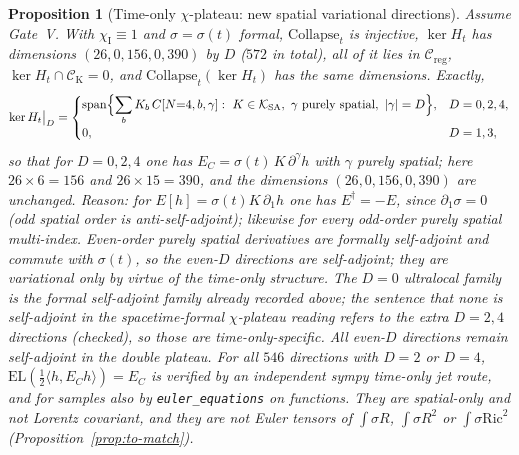 \documentclass{article}
\newtheorem{proposition}{Proposition}
\theoremstyle{remark}
\newcommand{\chiI}{\chi_{\mathrm I}}
\newcommand{\Creg}{\mathcal C_{\mathrm{reg}}}
\newcommand{\Coll}{\mathrm{Collapse}}
\begin{document}
\begin{proposition}[Time-only $\chi$-plateau: new spatial variational directions]
\label{prop:to-chiplateau}
Assume Gate~V.
With $\chiI\equiv1$ and $\sigma=\sigma(t)$ formal, $\Coll_t$ is injective, $\ker H_t$ has dimensions $(26,0,156,0,390)$ by $D$ ($572$ in total), all of it lies in $\Creg$, $\ker H_t\cap\mathcal C_{\mathrm K}=0$, and $\Coll_t(\ker H_t)$ has the same dimensions.
Exactly,
\[
\ker H_t\big|_{D}=
\begin{cases}
\operatorname{span}\Bigl\{\displaystyle\sum_b K_b\,C[N{=}4,b,\gamma]:\
K\in\mathcal K_{\mathrm{SA}},\ \gamma\text{ purely spatial},\ |\gamma|=D\Bigr\},
& D=0,2,4,\\[0.6em]
0,& D=1,3,
\end{cases}
\]
so that for $D=0,2,4$ one has $E_C=\sigma(t)\,K\,\partial^\gamma h$ with $\gamma$ purely spatial; here $26\times6=156$ and $26\times15=390$, and the dimensions $(26,0,156,0,390)$ are unchanged.
Reason: for $E[h]=\sigma(t)K\,\partial_1 h$ one has $E^\dagger=-E$, since $\partial_1\sigma=0$ (odd spatial order is anti-self-adjoint); likewise for every odd-order purely spatial multi-index. Even-order purely spatial derivatives are formally self-adjoint and commute with $\sigma(t)$, so the even-$D$ directions are self-adjoint; they are variational only by virtue of the time-only structure.
The $D=0$ ultralocal family is the formal self-adjoint family already recorded above; the sentence that none is self-adjoint in the spacetime-formal $\chi$-plateau reading refers to the \emph{extra} $D=2,4$ directions (checked), so those are time-only-specific.
All even-$D$ directions remain self-adjoint in the double plateau.
For all $546$ directions with $D=2$ or $D=4$, $\mathrm{EL}(\tfrac12\langle h,E_C h\rangle)=E_C$ is verified by an independent sympy time-only jet route, and for samples also by \texttt{euler\_equations} on functions.
They are spatial-only and not Lorentz covariant, and they are not Euler tensors of $\int\sigma R$, $\int\sigma R^2$ or $\int\sigma\mathrm{Ric}^2$ (Proposition~\ref{prop:to-match}).
\end{proposition}
\end{document}
